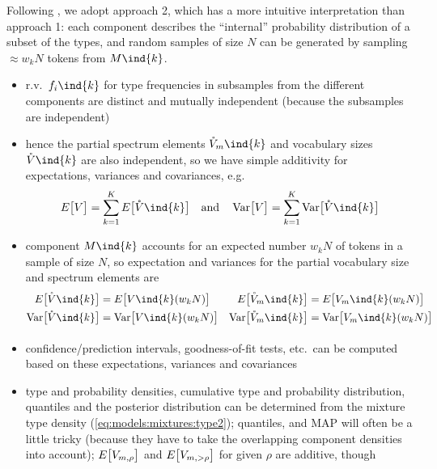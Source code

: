\documentclass[a4paper]{article}
\begin{document}
Following \citet[Sec.~4]{Baayen:01}, we adopt approach 2, which has a more
intuitive interpretation than approach 1: each component describes the
``internal'' probability distribution of a subset of the types, and random
samples of size $N$ can be generated by sampling $\approx w_k N$ tokens
from $M\ind{k}$.


\begin{itemize}
\item r.v.\ $f_i\ind{k}$ for type frequencies in subsamples from the different
  components are distinct and mutually independent (because the subsamples are
  independent)
\item hence the partial spectrum elements $\mathring{V}_m\ind{k}$ and vocabulary sizes
  $\mathring{V}\ind{k}$ are also independent, so we have simple additivity for
  expectations, variances and covariances, e.g.\
  \begin{equation}
    \label{eq:models:mixtures:partial-additive}
    \Exp{V} = \sum_{k=1}^K \Exp{\mathring{V}\ind{k}} \quad\text{and}\quad
    \Var{V} = \sum_{k=1}^K \Var{\mathring{V}\ind{k}}
  \end{equation}
\item component $M\ind{k}$ accounts for an expected number $w_k N$ of tokens
  in a sample of size $N$, so expectation and variances for the partial
  vocabulary size and spectrum elements are
  \begin{align}
    \label{eq:models:mixtures:partial-V-Vm}
    \Exp{\mathring{V}\ind{k}} & = \Exp{V\ind{k}(w_k N)} &
    \Exp{\mathring{V}_m\ind{k}} & = \Exp{V_m\ind{k}(w_k N)} \\
    \Var{\mathring{V}\ind{k}} & = \Var{V\ind{k}(w_k N)} &
    \Var{\mathring{V}_m\ind{k}} & = \Var{V_m\ind{k}(w_k N)} 
  \end{align}
\item confidence/prediction intervals, goodness-of-fit tests, etc.\ can be
  computed based on these expectations, variances and covariances
\item type and probability densities, cumulative type and probability
  distribution, quantiles and the posterior distribution can be determined
  from the mixture type density (\ref{eq:models:mixtures:type2}); quantiles,
  and MAP will often be a little tricky (because they have to take the
  overlapping component densities into account); $E_{}\bigl[V_{m,\rho}\bigr]$ and $E_{}\bigl[V_{m,> \rho}\bigr]$
  for given $\rho$ are additive, though

\end{itemize}
\end{document}
